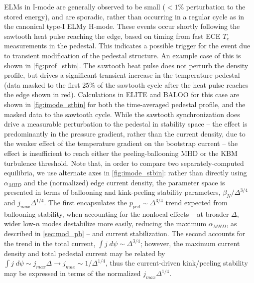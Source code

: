 ELMs in I-mode are generally observed to be small ($<1\%$ perturbation to the stored energy), and are sporadic, rather than occurring in a regular cycle as in the canonical type-I ELMy H-mode.  These events occur shortly following the sawtooth heat pulse reaching the edge, based on timing from fast ECE $T_e$ measurements in the pedestal.  This indicates a possible trigger for the event due to transient modification of the pedestal structure.  An example case of this is shown in \cref{fig:prof_stbin}.  The sawtooth heat pulse does not perturb the density profile, but drives a significant transient increase in the temperature pedestal (data masked to the first 25\% of the sawtooth cycle after the heat pulse reaches the edge shown in red).  Calculations in ELITE and BALOO for this case are shown in \cref{fig:imode_stbin} for both the time-averaged pedestal profile, and the masked data to the sawtooth cycle.  While the sawtooth synchronization does drive a measurable perturbation to the pedestal in stability space -- the effect is predominantly in the pressure gradient, rather than the current density, due to the weaker effect of the temperature gradient on the bootstrap current -- the effect is insufficient to reach either the peeling-ballooning MHD or the KBM turbulence threshold.  Note that, in order to compare two separately-computed equilibria, we use alternate axes in \cref{fig:imode_stbin}: rather than directly using $\alpha_{MHD}$ and the (normalized) edge current density, the parameter space is presented in terms of ballooning and kink-peeling stability parameters, $\beta_N/\Delta^{3/4}$ and $j_{max} \Delta^{1/4}$.  The first encapsulates the $p_{ped} \sim \Delta^{3/4}$ trend expected from ballooning stability, when accounting for the nonlocal effects -- at broader $\Delta$, wider low-$n$ modes destabilize more easily, reducing the maximum $\alpha_{MHD}$, as described in \cref{sec:mod_pb} -- and current stabilization.  The second accounts for the trend in the total current, $\int j \;d\psi \sim \Delta^{3/4}$; however, the maximum current density and total pedestal current may be related by $\int j \; d\psi \sim j_{max} \Delta \rightarrow j_{max} \sim 1/\Delta^{1/4}$, thus the current-driven kink/peeling stability may be expressed in terms of the normalized $j_{max} \Delta^{1/4}$.

